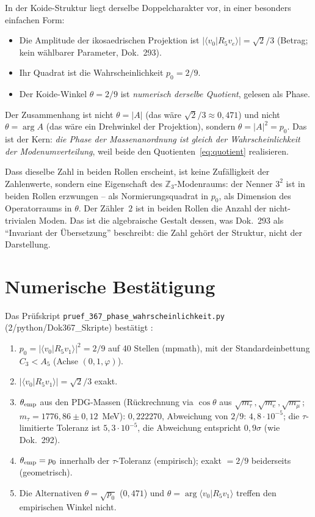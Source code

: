 In der Koide-Struktur liegt derselbe Doppelcharakter vor, in einer besonders einfachen Form:
\begin{itemize}
  \item Die Amplitude der ikosaedrischen Projektion ist $|\langle v_0|R_5 v_e\rangle| = \sqrt2/3$
    (Betrag; kein wählbarer Parameter, Dok.~293).
  \item Ihr Quadrat ist die Wahrscheinlichkeit $p_0 = 2/9$.
  \item Der Koide-Winkel $\theta = 2/9$ ist \emph{numerisch derselbe Quotient}, gelesen als
    Phase.
\end{itemize}
Der Zusammenhang ist nicht $\theta = |A|$ (das wäre $\sqrt2/3 \approx 0{,}471$) und nicht
$\theta = \arg A$ (das wäre ein Drehwinkel der Projektion), sondern $\theta = |A|^2 = p_0$.
Das ist der Kern: \emph{die Phase der Massenanordnung ist gleich der Wahrscheinlichkeit der
Modenumverteilung}, weil beide den Quotienten~\eqref{eq:quotient} realisieren.

Dass dieselbe Zahl in beiden Rollen erscheint, ist keine Zufälligkeit der Zahlenwerte, sondern
eine Eigenschaft des $\mathbb{Z}_3$-Modenraums: der Nenner $3^2$ ist in beiden Rollen erzwungen
-- als Normierungsquadrat in $p_0$, als Dimension des Operatorraums in $\theta$. Der Zähler~$2$
ist in beiden Rollen die Anzahl der nicht-trivialen Moden. Das ist die algebraische Gestalt
dessen, was Dok.~293 als \enquote{Invariant der Übersetzung} beschreibt: die Zahl gehört der
Struktur, nicht der Darstellung.

\section{Numerische Bestätigung}

Das Prüfskript \texttt{pruef\_367\_phase\_wahrscheinlichkeit.py} (2/python/Dok367\_Skripte)
bestätigt \KM:
\begin{enumerate}
  \item $p_0 = |\langle v_0|R_5 v_1\rangle|^2 = 2/9$ auf 40 Stellen (mpmath), mit der
    Standardeinbettung $C_3 < A_5$ (Achse $(0,1,\varphi)$).
  \item $|\langle v_0|R_5 v_1\rangle| = \sqrt2/3$ exakt.
  \item $\theta_{\rm emp}$ aus den PDG-Massen (Rückrechnung via $\cos\theta$ aus
    $\sqrt{m_\tau},\sqrt{m_e},\sqrt{m_\mu}$; $m_\tau = 1776{,}86 \pm 0{,}12$~MeV): $0{,}222270$,
    Abweichung von $2/9$: $4{,}8\cdot10^{-5}$; die $\tau$-limitierte Toleranz ist
    $5{,}3\cdot10^{-5}$, die Abweichung entspricht $0{,}9\sigma$ (wie Dok.~292).
  \item $\theta_{\rm emp} = p_0$ innerhalb der $\tau$-Toleranz (empirisch); exakt $= 2/9$
    beiderseits (geometrisch).
  \item Die Alternativen $\theta = \sqrt{p_0}$ ($0{,}471$) und $\theta = \arg\langle v_0|R_5 v_1\rangle$
    treffen den empirischen Winkel nicht.
\end{enumerate}

